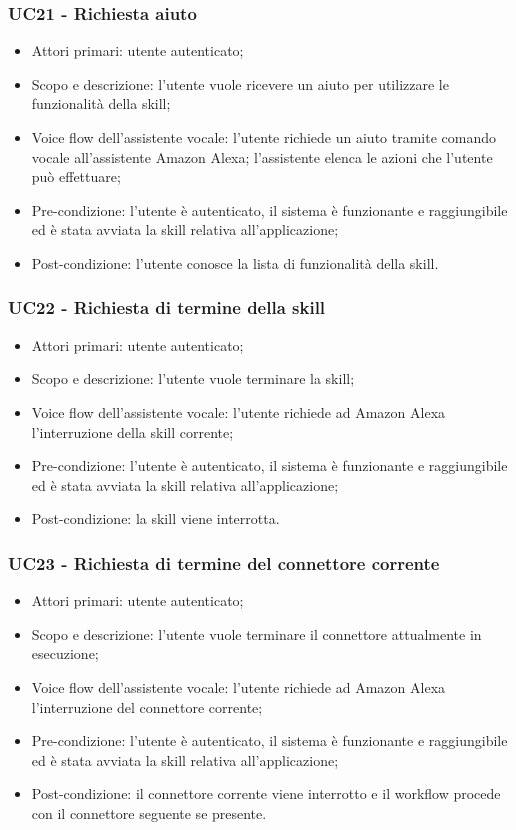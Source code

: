 \subsubsection{UC21 - Richiesta aiuto}
\begin{itemize}
	\item Attori primari: utente autenticato;
	\item Scopo e descrizione: l'utente vuole ricevere un aiuto per utilizzare le funzionalità della skill;
	\item Voice flow dell'assistente vocale: l'utente richiede un aiuto tramite comando vocale all'assistente Amazon Alexa; l'assistente elenca le azioni che l'utente può effettuare;
	\item Pre-condizione: l'utente è autenticato, il sistema è funzionante e raggiungibile ed è stata avviata la skill relativa all'applicazione;
	\item Post-condizione: l'utente conosce la lista di funzionalità della skill.
\end{itemize}
\subsubsection{UC22 - Richiesta di termine della skill}
\begin{itemize}
	\item Attori primari: utente autenticato;
	\item Scopo e descrizione: l'utente vuole terminare la skill;
	\item Voice flow dell'assistente vocale: l'utente richiede ad Amazon Alexa l'interruzione della skill corrente;
	\item Pre-condizione: l'utente è autenticato, il sistema è funzionante e raggiungibile ed è stata avviata la skill relativa all'applicazione;
	\item Post-condizione: la skill viene interrotta.
\end{itemize}
\subsubsection{UC23 - Richiesta di termine del connettore corrente}
\begin{itemize}
	\item Attori primari: utente autenticato;
	\item Scopo e descrizione: l'utente vuole terminare il connettore attualmente in esecuzione;
	\item Voice flow dell'assistente vocale: l'utente richiede ad Amazon Alexa l'interruzione del connettore corrente;
	\item Pre-condizione: l'utente è autenticato, il sistema è funzionante e raggiungibile ed è stata avviata la skill relativa all'applicazione;
	\item Post-condizione: il connettore corrente viene interrotto e il workflow procede con il connettore seguente se presente.
\end{itemize}
